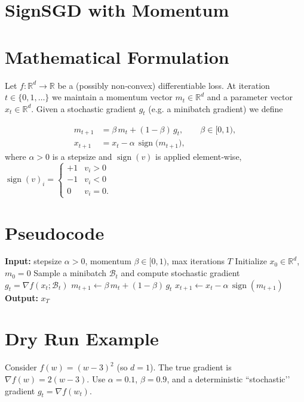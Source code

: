 \documentclass[11pt]{article}
\newcommand{\sign}{\operatorname{sign}}
\newcommand{\R}{\mathbb{R}}
\begin{document}
\section*{SignSGD with Momentum}

\section*{Mathematical Formulation}
Let $f:\R^{d}\rightarrow\R$ be a (possibly non‑convex) differentiable loss.
At iteration $t\in\{0,1,\dots\}$ we maintain a momentum vector $m_t\in\R^{d}$
and a parameter vector $x_t\in\R^{d}$.  
Given a stochastic gradient $g_t$ (e.g. a minibatch gradient) we define  

\[
\boxed{
\begin{aligned}
m_{t+1} &= \beta\, m_{t} + (1-\beta)\, g_{t}, \qquad \beta\in[0,1),\\[4pt]
x_{t+1} &= x_{t} - \alpha\, \sign\!\big(m_{t+1}\big),
\end{aligned}}
\]
where $\alpha>0$ is a stepsize and $\sign(v)$ is applied element‑wise,
$\sign(v)_i = \begin{cases}+1 & v_i>0\\ -1 & v_i<0\\ 0 & v_i=0.\end{cases}$

\section*{Pseudocode}
\begin{algorithm}[H]
\caption{SignSGD with Momentum}
\begin{algorithmic}[1]
\State \textbf{Input:} stepsize $\alpha>0$, momentum $\beta\in[0,1)$,
               max iterations $T$
\State Initialize $x_0\in\R^{d}$, $m_0 = 0$
    \State Sample a minibatch $\mathcal{B}_t$ and compute stochastic gradient 
          $g_t = \nabla f(x_t; \mathcal{B}_t)$
    \State $m_{t+1} \gets \beta\, m_t + (1-\beta)\, g_t$ \hfill{}
    \State $x_{t+1} \gets x_t - \alpha\, \sign(m_{t+1})$ \hfill{}
\EndFor
\State \textbf{Output:} $x_T$
\end{algorithmic}
\end{algorithm}

\section*{Dry Run Example}
Consider $f(w) = (w-3)^2$ (so $d=1$).  
The true gradient is $\nabla f(w)=2(w-3)$.  Use $\alpha=0.1$, $\beta=0.9$, and a deterministic “stochastic’’ gradient $g_t=\nabla f(w_t)$.
\end{document}
